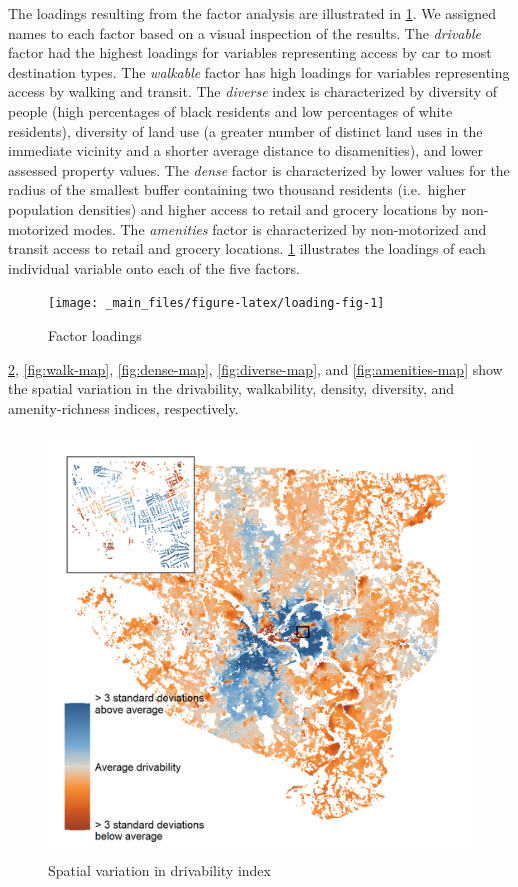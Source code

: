 \documentclass[
]{book}
\begin{document}
The loadings resulting from the factor analysis are illustrated in
\ref{fig:loading-fig}. We assigned names to each factor based on a visual
inspection of the results. The \emph{drivable} factor had the highest loadings
for variables representing access by car to most destination types. The
\emph{walkable} factor has high loadings for variables representing access
by walking and transit. The \emph{diverse} index is characterized by diversity of
people (high percentages of black residents and low percentages of white
residents), diversity of land use (a greater number of distinct land
uses in the immediate vicinity and a shorter average distance to disamenities),
and lower assessed property values. The \emph{dense} factor is characterized by lower
values for the radius of the smallest buffer containing two thousand residents
(i.e.~higher population densities) and higher access to retail and grocery
locations by non-motorized modes. The \emph{amenities} factor is characterized
by non-motorized and transit access to retail and grocery locations. \ref{fig:loading-fig} illustrates the loadings of each individual variable onto each of the five factors.

\begin{figure}
\texttt{[image: \_main\_files/figure-latex/loading-fig-1]} \caption{Factor loadings}\label{fig:loading-fig}
\end{figure}

\ref{fig:drive-map}, \ref{fig:walk-map}, \ref{fig:dense-map},
\ref{fig:diverse-map}, and \ref{fig:amenities-map} show the spatial
variation in the drivability, walkability, density, diversity, and amenity-richness indices, respectively.

\begin{figure}
\includegraphics[width=1\linewidth]{04_figures/drivable} \caption{Spatial variation in drivability index}\label{fig:drive-map}
\end{figure}
\end{document}
